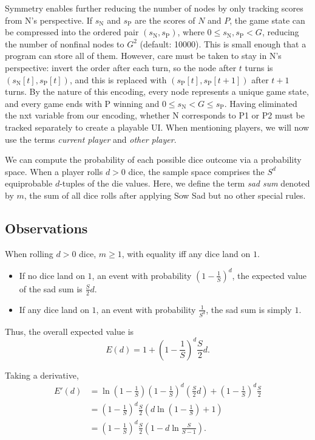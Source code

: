 \documentclass[12 pt]{article}
\newcommand{\smn}{s_\mathrm{N}}
\newcommand{\smp}{s_\mathrm{P}}
\begin{document}
			Symmetry enables further reducing the number of nodes by only tracking scores from N's perspective. If $\smn$ and $\smp$ are the scores of $N$ and $P$, the game state can be compressed into the ordered pair $(\smn, \smp)$, where $0 \le \smn, \smp < G$, reducing the number of nonfinal nodes to $G^2$ (default: 10000). This is small enough that a program can store all of them. However, care must be taken to stay in N's perspective: invert the order after each turn, so the node after $t$ turns is $(\smn[t], \smp[t])$, and this is replaced with $(\smp[t], \smp[t + 1])$ after $t + 1$ turns. By the nature of this encoding, every node represents a unique game state, and every game ends with P winning and $0 \le \smn < G \le \smp$. Having eliminated the nxt variable from our encoding, whether N corresponds to P1 or P2 must be tracked separately to create a playable UI. When mentioning players, we will now use the terms \textit{current player} and \textit{other player}.
		
			We can compute the probability of each possible dice outcome via a probability space. When a player rolls $d > 0$ dice, the sample space comprises the $S^d$ equiprobable $d$-tuples of the die values. Here, we define the term \textit{sad sum}  denoted by $m$, the sum of all dice rolls after applying Sow Sad but no other special rules.

		\subsection{Observations}
			When rolling $d > 0$ dice, $m \ge 1$, with equality iff any dice land on $1$.

			\begin{itemize}
				\item If no dice land on $1$, an event with probability $\left(1 - \frac{1}{S}\right)^d$, the expected value of the sad sum is $\frac{S}{2}d$.
				\item If any dice land on $1$, an event with probability $\frac{1}{S^d}$, the sad sum is simply $1$.
			\end{itemize}
			
			Thus, the overall expected value is
			\[
				E(d) = 1 + \left(1 - \frac{1}{S}\right)^d \frac{S}{2} d.
			\]

			Taking a derivative,
			\begin{align*}
				E'(d) &= \ln\left(1 - \frac{1}{S}\right) \left(1 - \frac{1}{S}\right)^d \left(\frac{S}{2}d\right) + \left(1 - \frac{1}{S}\right)^d \frac{S}{2} \\
				&= \left(1 - \frac{1}{S}\right)^d \frac{S}{2} \left(d \ln\left(1 - \frac{1}{S}\right) + 1\right) \\
				&= \left(1 - \frac{1}{S}\right)^d \frac{S}{2} \left(1 - d\ln\frac{S}{S - 1}\right).
			\end{align*}
\end{document}
